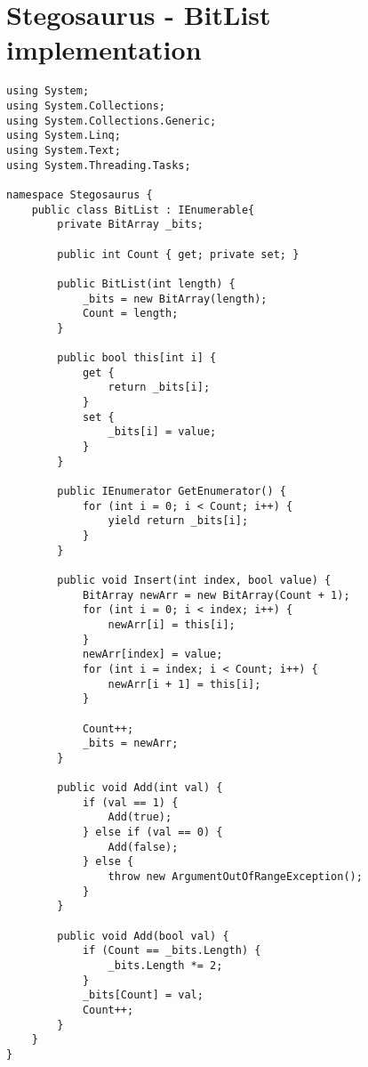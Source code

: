 \chapter{Stegosaurus - BitList implementation}
\label{app:C}
\begin{lstlisting}
using System;
using System.Collections;
using System.Collections.Generic;
using System.Linq;
using System.Text;
using System.Threading.Tasks;

namespace Stegosaurus {
    public class BitList : IEnumerable{
        private BitArray _bits;

        public int Count { get; private set; }

        public BitList(int length) {
            _bits = new BitArray(length);
            Count = length;
        }

        public bool this[int i] {
            get {
                return _bits[i];
            }
            set {
                _bits[i] = value;
            }
        }

        public IEnumerator GetEnumerator() {
            for (int i = 0; i < Count; i++) {
                yield return _bits[i];
            }
        }

        public void Insert(int index, bool value) {
            BitArray newArr = new BitArray(Count + 1);
            for (int i = 0; i < index; i++) {
                newArr[i] = this[i];
            }
            newArr[index] = value;
            for (int i = index; i < Count; i++) {
                newArr[i + 1] = this[i];
            }

            Count++;
            _bits = newArr;
        }

        public void Add(int val) {
            if (val == 1) {
                Add(true);
            } else if (val == 0) {
                Add(false);
            } else {
                throw new ArgumentOutOfRangeException();
            }
        }

        public void Add(bool val) {
            if (Count == _bits.Length) {
                _bits.Length *= 2;
            }
            _bits[Count] = val;
            Count++;
        }
    }
}
\end{lstlisting}